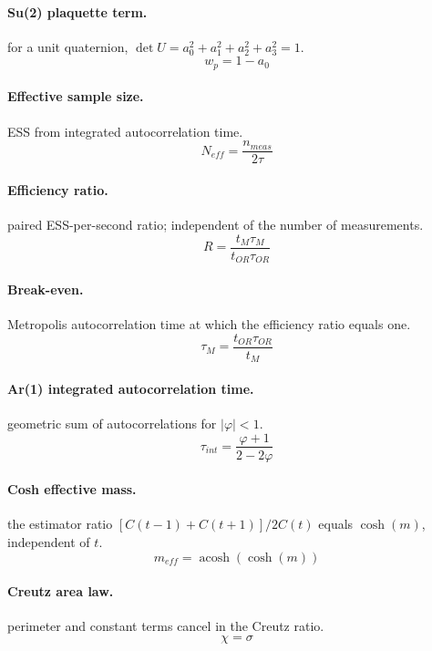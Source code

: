 \documentclass[11pt]{article}
\begin{document}
\paragraph{Su(2) plaquette term.} for a unit quaternion, $\det U = a_{0}^{2} + a_{1}^{2} + a_{2}^{2} + a_{3}^{2} = 1$.
\begin{equation}
  w_{p} = 1 - a_{0}
\end{equation}
\paragraph{Effective sample size.} ESS from integrated autocorrelation time.
\begin{equation}
  N_{eff} = \frac{n_{meas}}{2 \tau}
\end{equation}
\paragraph{Efficiency ratio.} paired ESS-per-second ratio; independent of the number of measurements.
\begin{equation}
  R = \frac{t_{M} \tau_{M}}{t_{OR} \tau_{OR}}
\end{equation}
\paragraph{Break-even.} Metropolis autocorrelation time at which the efficiency ratio equals one.
\begin{equation}
  \tau_{M} = \frac{t_{OR} \tau_{OR}}{t_{M}}
\end{equation}
\paragraph{Ar(1) integrated autocorrelation time.} geometric sum of autocorrelations for $|\varphi|<1$.
\begin{equation}
  \tau_{int} = \frac{\varphi + 1}{2 - 2 \varphi}
\end{equation}
\paragraph{Cosh effective mass.} the estimator ratio $[C(t-1)+C(t+1)]/2C(t)$ equals $\cosh{\left(m \right)}$, independent of $t$.
\begin{equation}
  m_{eff} = \operatorname{acosh}{\left(\cosh{\left(m \right)} \right)}
\end{equation}
\paragraph{Creutz area law.} perimeter and constant terms cancel in the Creutz ratio.
\begin{equation}
  \chi = \sigma
\end{equation}
\end{document}
